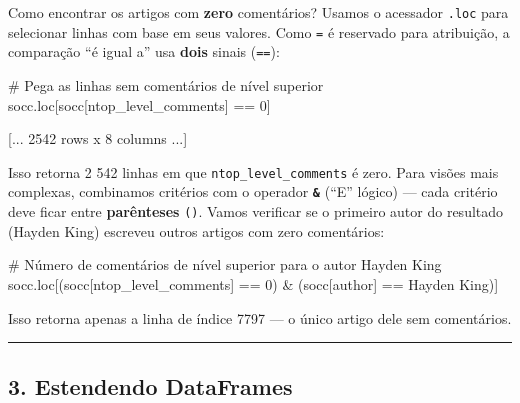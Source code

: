 \documentclass[
  brazilian,
  11pt,
]{article}
\newenvironment{Shaded}{\begin{snugshade}}{\end{snugshade}}
\newcommand{\CommentTok}[1]{\textcolor[rgb]{0.48,0.49,0.49}{#1}}
\newcommand{\DecValTok}[1]{\textcolor[rgb]{0.96,0.45,0.00}{#1}}
\newcommand{\NormalTok}[1]{\textcolor[rgb]{0.81,0.81,0.76}{#1}}
\newcommand{\OperatorTok}[1]{\textcolor[rgb]{0.81,0.81,0.76}{#1}}
\newcommand{\StringTok}[1]{\textcolor[rgb]{0.96,0.31,0.31}{#1}}
\let\oldtexttt\texttt
\renewcommand{\texttt}[1]{{\color{inlink}\oldtexttt{#1}}}
\begin{document}
Como encontrar os artigos com \textbf{zero} comentários? Usamos o
acessador \texttt{.loc} para selecionar linhas com base em seus valores.
Como \texttt{=} é reservado para atribuição, a comparação ``é igual a''
usa \textbf{dois} sinais (\texttt{==}):

\begin{Shaded}
\begin{Highlighting}[]
\CommentTok{\# Pega as linhas sem comentários de nível superior}
\NormalTok{socc.loc[socc[}\StringTok{\textquotesingle{}ntop\_level\_comments\textquotesingle{}}\NormalTok{] }\OperatorTok{==} \DecValTok{0}\NormalTok{]}
\end{Highlighting}
\end{Shaded}

\begin{Shaded}
\begin{Highlighting}[]
\NormalTok{[... 2542 rows x 8 columns ...]}
\end{Highlighting}
\end{Shaded}

Isso retorna 2 542 linhas em que \texttt{ntop\_level\_comments} é zero.
Para visões mais complexas, combinamos critérios com o operador
\textbf{\texttt{\&}} (``E'' lógico) --- cada critério deve ficar entre
\textbf{parênteses} \texttt{()}. Vamos verificar se o primeiro autor do
resultado (Hayden King) escreveu outros artigos com zero comentários:

\begin{Shaded}
\begin{Highlighting}[]
\CommentTok{\# Número de comentários de nível superior para o autor Hayden King}
\NormalTok{socc.loc[(socc[}\StringTok{\textquotesingle{}ntop\_level\_comments\textquotesingle{}}\NormalTok{] }\OperatorTok{==} \DecValTok{0}\NormalTok{) }\OperatorTok{\&}\NormalTok{ (socc[}\StringTok{\textquotesingle{}author\textquotesingle{}}\NormalTok{] }\OperatorTok{==} \StringTok{\textquotesingle{}Hayden King\textquotesingle{}}\NormalTok{)]}
\end{Highlighting}
\end{Shaded}

Isso retorna apenas a linha de índice 7797 --- o único artigo dele sem
comentários.

\begin{center}\rule{0.5\linewidth}{0.5pt}\end{center}

\subsection{3. Estendendo DataFrames}\label{estendendo-dataframes}
\end{document}
